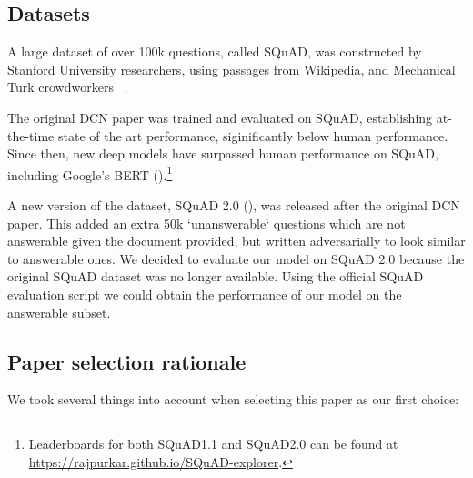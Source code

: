 \documentclass[a4paper, 10pt, conference]{article}
\newcommand{\TODOx}[1]{{\color{red}\textbf{TODO: #1}}}
\begin{document}
\subsection{Datasets}

A large dataset of over 100k questions, called SQuAD, was constructed by Stanford University researchers, using passages from Wikipedia, and Mechanical Turk crowdworkers ~\cite{rajpurkar2016squad}.

The original DCN paper was trained and evaluated on SQuAD, establishing at-the-time state of the art performance, siginificantly below human performance.
Since then, new deep models have surpassed human performance on SQuAD, including Google's BERT (\cite{bert}).\footnote{Leaderboards for both SQuAD1.1 and SQuAD2.0 can be found at \href{https://rajpurkar.github.io/SQuAD-explorer}{https://rajpurkar.github.io/SQuAD-explorer}.}


A new version of the dataset, SQuAD 2.0 (\cite{rajpurkar2018know}), was released after the original DCN paper. This added an extra 50k `unanswerable` questions which are not answerable given the document provided, but written adversarially to look similar to answerable ones. We decided to evaluate our model on SQuAD 2.0 because the original SQuAD dataset was no longer available.
Using the official SQuAD evaluation script we could obtain the performance of our model on the answerable subset. %


\subsection{Paper selection rationale}

We took several things into account when selecting this paper as our first choice:
\end{document}
